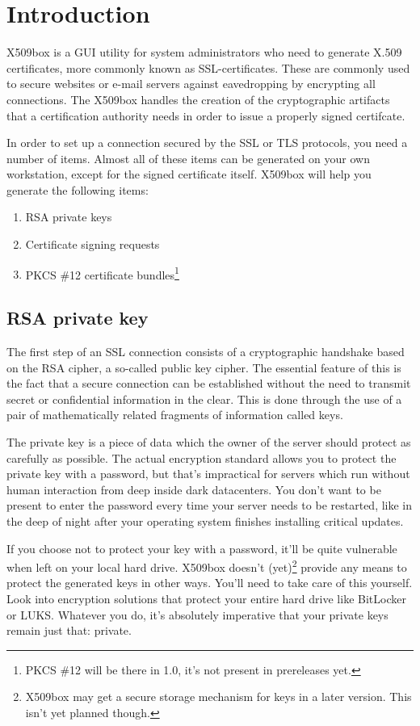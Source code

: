 \documentclass[a4paper,12pt]{article}
\begin{document}
\section{Introduction}
X509box is a GUI utility for system administrators who need to generate X.509 certificates, more commonly known as SSL-certificates. These are commonly used to secure websites or e-mail servers against eavedropping by encrypting all connections. The X509box handles the creation of the cryptographic artifacts that a certification authority needs in order to issue a properly signed certifcate.

In order to set up a connection secured by the SSL or TLS protocols, you need a number of items. Almost all of these items can be generated on your own workstation, except for the signed certificate itself. X509box will help you generate the following items:
\begin{enumerate}
\item RSA private keys
\item Certificate signing requests
\item PKCS \#12 certificate bundles\footnote{PKCS \#12 will be there in 1.0, it's not present in prereleases yet.}
\end{enumerate}

\subsection{RSA private key}
The first step of an SSL connection consists of a cryptographic handshake based on the RSA cipher, a so-called public key cipher. The essential feature of this is the fact that a secure connection can be established without the need to transmit secret or confidential information in the clear. This is done through the use of a pair of mathematically related fragments of information called keys.

The private key is a piece of data which the owner of the server should protect as carefully as possible. The actual encryption standard allows you to protect the private key with a password, but that's impractical for servers which run without human interaction from deep inside dark datacenters. You don't want to be present to enter the password every time your server needs to be restarted, like in the deep of night after your operating system finishes installing critical updates.

If you choose not to protect your key with a password, it'll be quite vulnerable when left on your local hard drive. X509box doesn't (yet)\footnote{X509box may get a secure storage mechanism for keys in a later version. This isn't yet planned though.} provide any means to protect the generated keys in other ways. You'll need to take care of this yourself. Look into encryption solutions that protect your entire hard drive like BitLocker or LUKS. Whatever you do, it's absolutely imperative that your private keys remain just that: private. 
\end{document}
